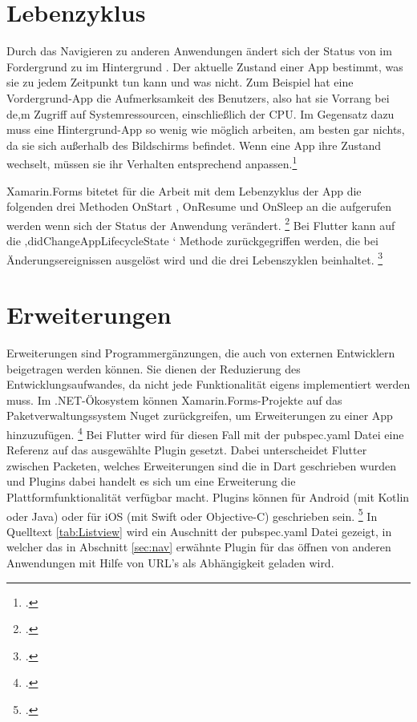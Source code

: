 \section{Lebenzyklus}
Durch das Navigieren zu anderen Anwendungen ändert sich der Status von im Fordergrund zu im Hintergrund . Der aktuelle Zustand einer App bestimmt, was sie zu jedem Zeitpunkt tun kann und was nicht.  Zum Beispiel hat eine Vordergrund-App die Aufmerksamkeit des Benutzers, also hat sie Vorrang bei de,m Zugriff auf Systemressourcen, einschließlich der CPU.  Im Gegensatz dazu muss eine Hintergrund-App so wenig wie möglich arbeiten, am besten gar nichts, da sie sich außerhalb des Bildschirms befindet.  Wenn eine App ihre Zustand wechselt,  müssen sie ihr Verhalten entsprechend anpassen.\footcite[Vgl.][Abgerufen am \today]{AppleLifecycycle2020} 

Xamarin.Forms bitetet für die Arbeit mit dem Lebenzyklus der App die folgenden drei Methoden \glq OnStart\grq{} , \glq OnResume\grq{}  und \glq OnSleep\grq{} an die aufgerufen werden wenn sich der Status der Anwendung verändert. \footcite[Vgl.][Abgerufen am \today]{MicrosoftXamLifecycle2020} Bei Flutter kann auf die ‚didChangeAppLifecycleState ‘ Methode zurückgegriffen werden, die bei Änderungsereignissen ausgelöst wird und die drei Lebenszyklen beinhaltet. \footcite[Vgl.][Abgerufen am \today]{GoogleFlutterLifeCycle2020} 

\section{Erweiterungen}
Erweiterungen sind Programmergänzungen, die auch von externen Entwicklern beigetragen werden können.  Sie dienen der Reduzierung des Entwicklungsaufwandes, da nicht jede Funktionalität eigens implementiert werden muss.  Im .NET-Ökosystem können Xamarin.Forms-Projekte auf das Paketverwaltungssystem Nuget zurückgreifen,  um Erweiterungen zu einer App hinzuzufügen. \footcite[Vgl.][Abgerufen am \today]{MicrosoftXamNuget2020}  Bei Flutter wird für diesen Fall mit der pubspec.yaml Datei eine Referenz auf das ausgewählte Plugin gesetzt.  Dabei unterscheidet Flutter zwischen Packeten, welches Erweiterungen sind die in Dart geschrieben wurden und Plugins dabei handelt es sich um eine Erweiterung die Plattformfunktionalität verfügbar macht.  Plugins können für Android (mit Kotlin oder Java) oder für  iOS (mit Swift oder Objective-C) geschrieben sein. \footcite[Vgl.][Abgerufen am \today]{GoogleFlutterPackages2020} In Quelltext \ref{tab:Listview} wird ein Auschnitt der pubspec.yaml Datei gezeigt, in welcher das in Abschnitt \ref{sec:nav} erwähnte Plugin für das öffnen von anderen Anwendungen mit Hilfe von URL's als Abhängigkeit geladen wird.

